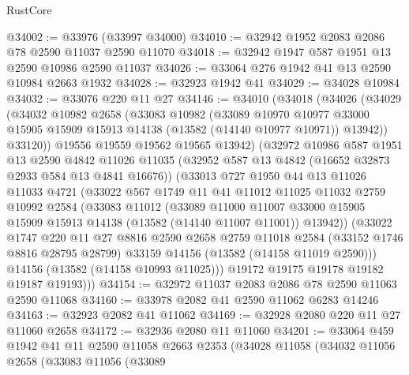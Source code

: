 \begin{lexlean}{RustCore}
\begin{coremodule}
@34002 := @33976 (@33997 @34000)
@34010 := @32942 @1952 @2083 @2086 @78 @2590 @11037 @2590 @11070
@34018 := @32942 @1947 @587 @1951 @13 @2590 @10986 @2590 @11037
@34026 := @33064 @276 @1942 @41 @13 @2590 @10984 @2663 @1932
@34028 := @32923 @1942 @41
@34029 := @34028 @10984
@34032 := @33076 @220 @11 @27
@34146 := @34010
    (@34018
      (@34026
        (@34029
          (@34032
            @10982
            @2658
            (@33083
              @10982
              (@33089
                @10970
                @10977
                @33000
                @15905
                @15909
                @15913
                @14138
                (@13582 (@14140 @10977 @10971))
                @13942))
            @33120))
        @19556
        @19559
        @19562
        @19565
        @13942)
      (@32972
        @10986
        @587
        @1951
        @13
        @2590
        @4842
        @11026
        @11035
        (@32952 @587 @13 @4842 (@16652 @32873 @2933 @584 @13 @4841 @16676))
        (@33013
          @727
          @1950
          @44
          @13
          @11026
          @11033
          @4721
          (@33022
            @567
            @1749
            @11
            @41
            @11012
            @11025
            @11032
            @2759
            @10992
            @2584
            (@33083
              @11012
              (@33089
                @11000
                @11007
                @33000
                @15905
                @15909
                @15913
                @14138
                (@13582 (@14140 @11007 @11001))
                @13942))
            (@33022
              @1747
              @220
              @11
              @27
              @8816
              @2590
              @2658
              @2759
              @11018
              @2584
              (@33152 @1746 @8816 @28795 @28799)
              @33159
              @14156
              (@13582 (@14158 @11019 @2590)))
            @14156
            (@13582 (@14158 @10993 @11025)))
          @19172
          @19175
          @19178
          @19182
          @19187
          @19193)))
@34154 := @32972 @11037 @2083 @2086 @78 @2590 @11063 @2590 @11068
@34160 := @33978 @2082 @41 @2590 @11062 @6283 @14246
@34163 := @32923 @2082 @41 @11062
@34169 := @32928 @2080 @220 @11 @27 @11060 @2658
@34172 := @32936 @2080 @11 @11060
@34201 := @33064
    @459
    @1942
    @41
    @11
    @2590
    @11058
    @2663
    @2353
    (@34028
      @11058
      (@34032
        @11056
        @2658
        (@33083
          @11056
          (@33089

\end{coremodule}
\end{lexlean}
